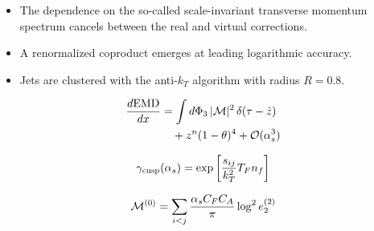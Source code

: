 \begin{itemize}
  \item The dependence on the so-called scale-invariant transverse momentum spectrum cancels between the real and virtual corrections.
  \item A renormalized coproduct emerges at leading logarithmic accuracy.
  \item Jets are clustered with the anti-$k_T$ algorithm with radius $R = 0.8$.
\end{itemize}

\begin{align}
  \frac{d \mathrm{EMD}}{d x} &= \int d\Phi_{3} \, |\mathcal{M}|^2 \, \delta(\tau - \hat{z}) \nonumber \\
  &\quad + {z}^{n} (1 - \theta)^{4} + \mathcal{O}(\alpha_s^3) \label{eq:2}
\end{align}

\begin{equation}
  \gamma_{\rm cusp}(\alpha_s) = \exp\left[\frac{s_{ij}}{k_T^2} T_F n_f\right]
  \label{eq:4}
\end{equation}

\begin{equation}
  \mathcal{M}^{(0)} = \sum_{i<j} \frac{\alpha_s C_F C_A}{\pi} \log^2 e_2^{(2)}
  \label{eq:5}
\end{equation}

